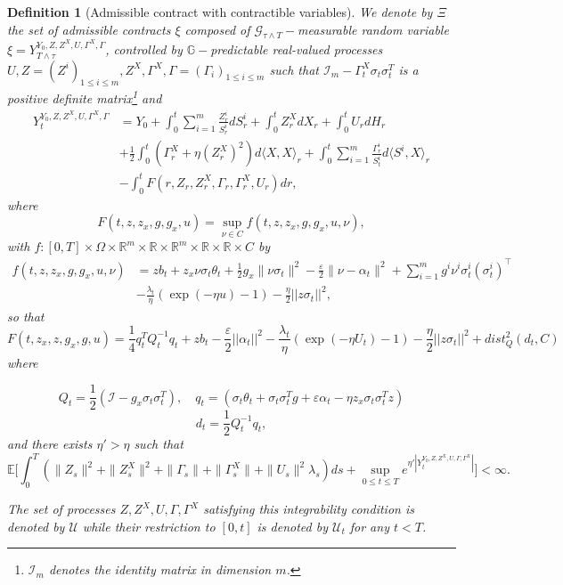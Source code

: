 \documentclass[11pt,a4paper]{article}
\theoremstyle{thmstyleone}%
\theoremstyle{thmstyletwo}%
\theoremstyle{thmstylethree}%
\newtheorem{definition}{Definition}%
\begin{document}
\begin{definition}[Admissible contract with contractible variables]\label{def:contract} We denote by $\Xi$ the set of admissible contracts $\xi$ composed of $\mathcal G_{\tau\wedge T}-$measurable random variable $\xi=Y_{T\wedge \tau}^{Y_0,Z,Z^X,U,\Gamma^X,\Gamma}$, controlled by $\mathbb G-$predictable real-valued processes $U,Z=(Z^i)_{1\leq i\leq m},Z^X,\Gamma^X,\Gamma=(\Gamma_i)_{1\leq i\leq m}$ such that $\mathcal{I}_m - \Gamma^X_t \sigma_t \sigma^T_t$ is a positive definite matrix\footnote{$\mathcal{I}_m$ denotes the identity matrix in dimension $m$.} and
    \begin{align*}
   Y_t^{Y_0,Z,Z^X,U,\Gamma^X,\Gamma}&= Y_0+ \int_{0}^{t}\sum_{i=1}^m \frac{Z^i_r}{S^i_r} dS^i_r + \int_{0 }^{t} Z_r^X dX_r + \int_{0}^{t} U_r dH_r \\
    &+ \frac{1}{2}\int_{0}^{t} (\Gamma_r^X + \eta (Z_r^X)^2 ) d\langle X, X\rangle_r + \int_{0}^{t} \sum_{i=1}^m \frac{\Gamma_r^i}{S^i_t} d\langle S^i, X\rangle_r\\
    &- \int_{0}^{t} F(r, Z_r, Z_r^X, \Gamma_r, \Gamma_r^X, U_r) dr,
\end{align*}
where \[ F(t, z, z_x, g, g_x, u)=\sup_{\nu\in C} f(t,z,z_x,g,g_x,u,\nu),\] with $f:[0,T]\times\Omega\times \mathbb R^m\times\mathbb R\times \mathbb R^m\times\mathbb R\times \mathbb R\times C$ by
\begin{align*} f(t,z,z_x,g,g_x,u,\nu)&= z b_t +z_x\nu \sigma_t \theta_t + \frac{1}{2} g_x\| \nu\sigma_t\|^2 - \frac{\varepsilon}{2}\|\nu - \alpha_t\|^2 +\sum_{i=1}^m g^i \nu^i \sigma_t^i(\sigma_t^i)^\top\\
&- \frac{\lambda_t}{\eta} (\exp{(-\eta u) - 1})- \frac{\eta}{2}||z \sigma_t||^2,\end{align*}
 so that
\begin{equation}\label{eq:generator}
    F(t, z_x, z, g_x, g, u) = \frac{1}{4}q_t^T Q_t^{-1} q_t + z b_t - \frac{\varepsilon}{2} ||\alpha_t||^2 - \frac{\lambda_t}{\eta} (\exp{(-\eta U_t) - 1}) - \frac{\eta}{2}||z \sigma_t||^2+ dist^2_Q(d_t, C)
\end{equation}
where 

 \[ Q_t = \frac{1}{2}(\mathcal{I} - g_x \sigma_t \sigma^T_t ),\quad  q_t = (\sigma_t \theta_t + \sigma_t \sigma^T_t g + \varepsilon\alpha_t - \eta z_x  \sigma_t \sigma^T_t z)\]
\[
    d_t = \frac{1}{2} Q_t^{-1} q_t, 
\]
and there exists $\eta'>\eta$ such that   \[\mathbb E\Big[\int_0^T (\|Z_s\|^2+\|Z^X_s\|^2+\|\Gamma_s\|+\|\Gamma^X_s\| +\|U_s\|^2\lambda_s) ds + \sup_{0\leq t\leq T} e^{\eta'|Y_t^{Y_0,Z,Z^X,U,\Gamma,\Gamma^X}|}\Big]<\infty.\]

The set of processes $Z,Z^X,U,\Gamma,\Gamma^X$ satisfying this integrability condition is denoted by $\mathcal U$ while their restriction to $[0,t]$ is denoted by $\mathcal U_t$ for any $t<T$.
   \end{definition}
\end{document}
